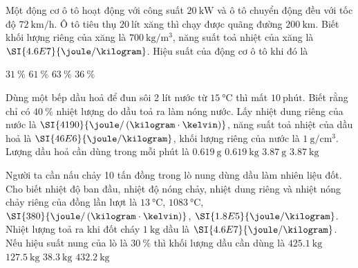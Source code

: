 \begin{ex}
	Một động cơ ô tô hoạt động với công suất $\SI{20}{\kilo\watt}$ và ô tô chuyển động đều với tốc độ $\SI{72}{\kilo\meter/\hour}$. Ô tô tiêu thụ $\SI{20}{\text{lít}}$ xăng thì chạy được quãng đường $\SI{200}{\kilo\meter}$. Biết khối lượng riêng của xăng là $\SI{700}{\kilogram/\meter^3}$, năng suất toả nhiệt của xăng là $\SI{4.6E7}{\joule/\kilogram}$. Hiệu suất của động cơ ô tô khi đó là
	
	\choice
	{\True $\SI{31}{\percent}$}
	{$\SI{61}{\percent}$}
	{$\SI{63}{\percent}$}
	{$\SI{36}{\percent}$}
\end{ex}
\begin{ex}
	Dùng một bếp dầu hoả để đun sôi 2 lít nước từ $\SI{15}{\celsius}$ thì mất $\SI{10}{\text{phút}}$. Biết rằng chỉ có $\SI{40}{\percent}$ nhiệt lượng do dầu toả ra làm nóng nước. Lấy nhiệt dung riêng của nước là $\SI{4190}{\joule/\left(\kilogram\cdot\kelvin\right)}$, năng suất toả nhiệt của dầu hoả là $\SI{46E6}{\joule/\kilogram}$, khối lượng riêng của nước là $\SI{1}{\gram/\centi\meter^3}$. Lượng dầu hoả cần dùng trong mỗi phút là
	\choice
	{$\SI{0.619}{\gram}$}
	{$\SI{0.619}{\kilogram}$}
	{\True $\SI{3.87}{\gram}$}
	{$\SI{3.87}{\kilogram}$}
\end{ex}
\begin{ex}
	Người ta cần nấu chảy 10 tấn đồng trong lò nung dùng dầu làm nhiên liệu đốt. Cho biết nhiệt độ ban đầu, nhiệt độ nóng chảy, nhiệt dung riêng và nhiệt nóng chảy riêng của đồng lần lượt là $\SI{13}{\celsius}$, $\SI{1083}{\celsius}$, $\SI{380}{\joule/\left(\kilogram\cdot\kelvin\right)}$, $\SI{1.8E5}{\joule/\kilogram}$. Nhiệt lượng toả ra khi đốt cháy $\SI{1}{\kilogram}$ dầu là $\SI{4.6E7}{\joule/\kilogram}$. Nếu hiệu suất nung của lò là $\SI{30}{\percent}$ thì khối lượng dầu cần dùng là
	\choice
	{\True $\SI{425.1}{\kilogram}$}
	{$\SI{127.5}{\kilogram}$}
	{$\SI{38.3}{\kilogram}$}
	{$\SI{432.2}{\kilogram}$}
\end{ex}
